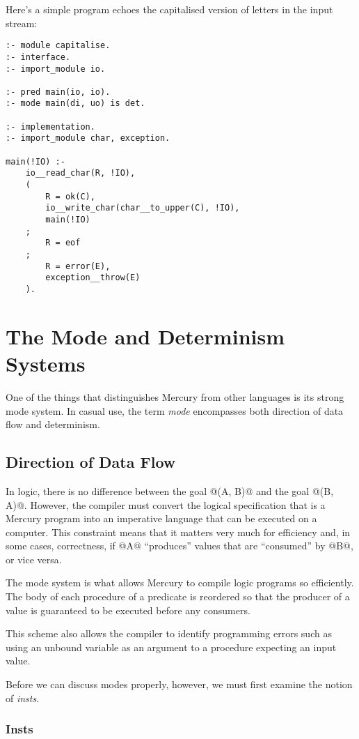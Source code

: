 \documentclass[a4paper,11pt,notitlepage,onecolumn]{article}
\begin{document}
Here's a simple program echoes the capitalised version of
letters in the input stream:
\begin{verbatim}
:- module capitalise.
:- interface.
:- import_module io.

:- pred main(io, io).
:- mode main(di, uo) is det.

:- implementation.
:- import_module char, exception.

main(!IO) :-
    io__read_char(R, !IO),
    (
        R = ok(C),
        io__write_char(char__to_upper(C), !IO),
        main(!IO)
    ;
        R = eof
    ;
        R = error(E),
        exception__throw(E)
    ).
\end{verbatim}



\section{The Mode and Determinism Systems}

One of the things that distinguishes Mercury from other languages
is its strong mode system.  In casual use, the term \emph{mode}
encompasses both direction of data flow and determinism.

\subsection{Direction of Data Flow}

In logic, there is no difference between the goal @(A, B)@ and
the goal @(B, A)@.  However, the compiler must convert the
logical specification that is a Mercury program into an
imperative language that can be executed on a computer.  This
constraint means that it matters very much for efficiency and,
in some cases, correctness, if @A@ ``produces'' values that
are ``consumed'' by @B@, or vice versa.

The mode system is what allows Mercury to compile logic
programs so efficiently.  The body of each procedure of a
predicate is reordered so that the producer of a value is
guaranteed to be executed before any consumers.

This scheme also allows the compiler to identify programming
errors such as using an unbound variable as an argument to a
procedure expecting an input value.

Before we can discuss modes properly, however, we must first
examine the notion of \emph{insts}.

\subsubsection{Insts}
\end{document}
